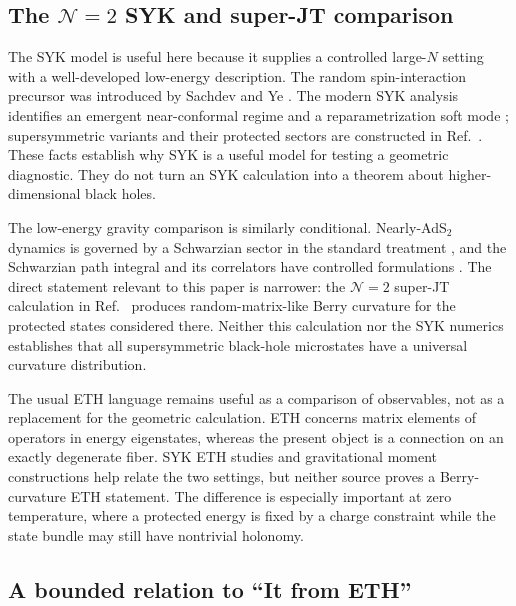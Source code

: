 \subsection{The \texorpdfstring{$\mathcal{N}=2$}{N=2} SYK and super-JT comparison}

The SYK model is useful here because it supplies a controlled large-$N$
setting with a well-developed low-energy description.  The random
spin-interaction precursor was introduced by Sachdev and Ye
\cite{sachdevye1993}.  The modern SYK analysis identifies an emergent
near-conformal regime and a reparametrization soft mode
\cite{maldacenastanford2016}; supersymmetric variants and their protected
sectors are constructed in Ref.~\cite{fu2017susy}.  These facts establish why
SYK is a useful model for testing a geometric diagnostic.  They do not turn an
SYK calculation into a theorem about higher-dimensional black holes.

The low-energy gravity comparison is similarly conditional.  Nearly-AdS$_2$
 dynamics is governed by a Schwarzian sector in the standard treatment
\cite{maldacenastanfordyang2016}, and the Schwarzian path integral and its
correlators have controlled formulations
\cite{stanfordwitten2017,mertens2017schwarzian}.  The direct statement relevant
to this paper is narrower: the $\mathcal{N}=2$ super-JT calculation in
Ref.~\cite{chen2026berry} produces random-matrix-like Berry curvature for the
protected states considered there.  Neither this calculation nor the SYK
numerics establishes that all supersymmetric black-hole microstates have a
universal curvature distribution.

The usual ETH language remains useful as a comparison of observables, not as a
replacement for the geometric calculation.  ETH concerns matrix elements of
operators in energy eigenstates, whereas the present object is a connection on
an exactly degenerate fiber.  SYK ETH studies
\cite{sonner2017syketh} and gravitational moment constructions
\cite{pollack2020gravityeth} help relate the two settings, but neither source
proves a Berry-curvature ETH statement.  The difference is especially
important at zero temperature, where a protected energy is fixed by a charge
constraint while the state bundle may still have nontrivial holonomy.

\subsection{A bounded relation to ``It from ETH''}

